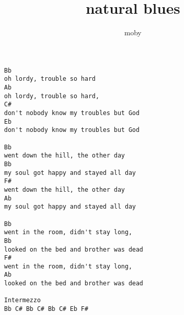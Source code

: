 \author{moby}
\title{natural blues}
\maketitle
\begin{verbatim}
Bb
oh lordy, trouble so hard
Ab
oh lordy, trouble so hard,
C#
don't nobody know my troubles but God
Eb
don't nobody know my troubles but God

Bb
went down the hill, the other day
Bb
my soul got happy and stayed all day
F#
went down the hill, the other day
Ab
my soul got happy and stayed all day

Bb
went in the room, didn't stay long,
Bb
looked on the bed and brother was dead
F#
went in the room, didn't stay long,
Ab
looked on the bed and brother was dead

Intermezzo
Bb C# Bb C# Bb C# Eb F#
\end{verbatim}